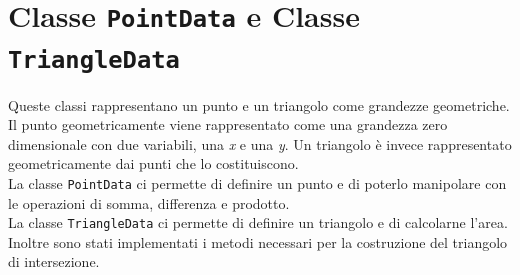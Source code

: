 \section{Classe \texttt{PointData} e Classe \texttt{TriangleData}}
Queste classi rappresentano un punto e un triangolo come grandezze geometriche.
Il punto geometricamente viene rappresentato come una grandezza zero dimensionale con due variabili, una \textit{x} e una \textit{y}.
Un triangolo è invece  rappresentato geometricamente dai punti che lo costituiscono.\\
\noindent La classe \texttt{PointData} ci permette di definire un punto e di poterlo manipolare con le operazioni di somma, differenza e prodotto.\\
\noindent La classe \texttt{TriangleData} ci permette di definire un triangolo e di calcolarne l'area. Inoltre sono stati implementati i metodi necessari per la costruzione del triangolo di intersezione.
